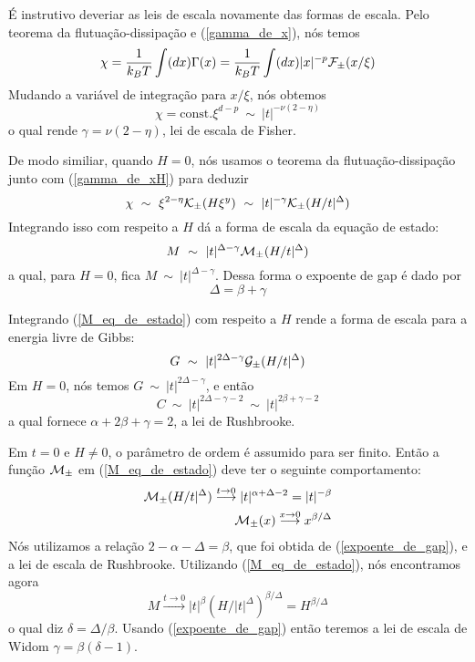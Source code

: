 É instrutivo deveriar as leis de escala novamente das formas de escala. Pelo teorema da flutuação-dissipação e (\ref{gamma_de_x}), nós temos
\begin{eqnarray*}
\chi=\frac{1}{k_{B}T}\int (dx) \Gamma(x)=\frac{1}{k_{B}T}\int (dx) |x|^{-p} {\cal F}_{\pm}(x/\xi)
\end{eqnarray*}
Mudando a variável de integração para $x/\xi$, nós obtemos
\begin{equation}
\chi= \text{const.}\xi^{d-p}~\sim~|t|^{-\nu(2-\eta)}
\end{equation}
o qual rende $\gamma=\nu(2-\eta)$, lei de escala de Fisher.

De modo similiar, quando $H=0$, nós usamos o teorema da flutuação-dissipação junto com (\ref{gamma_de_xH}) para deduzir
\begin{equation}
\chi~\sim~\xi^{2-\eta}{\cal K}_{\pm}(H\xi^{y})~\sim~|t|^{-\gamma}{\cal K}_{\pm}(H/t|^{\Delta})
\end{equation}
Integrando isso com respeito a $H$ dá a forma de escala da equação de estado:
\begin{equation}
M~\sim~|t|^{\Delta-\gamma}{\cal M}_{\pm}(H/t|^{\Delta})
\label{M_eq_de_estado}
\end{equation}
a qual, para $H=0$, fica $M~\sim~|t|^{\Delta-\gamma}$. Dessa forma o expoente de gap é dado por
\begin{equation}
\Delta=\beta+\gamma
\label{expoente_de_gap}
\end{equation}

Integrando (\ref{M_eq_de_estado}) com respeito a $H$ rende a forma de escala para a energia livre de Gibbs:
\begin{equation}
G~\sim~|t|^{2\Delta-\gamma}{\cal G}_{\pm}(H/t|^{\Delta})
\label{energia_G_de_xi}
\end{equation}
Em $H=0$, nós temos $G~\sim~|t|^{2\Delta-\gamma}$, e então
\begin{equation}
C~\sim~|t|^{2\Delta-\gamma-2}~\sim~|t|^{2\beta+\gamma-2}
\end{equation}
a qual fornece $\alpha+2\beta+\gamma=2$, a lei de Rushbrooke.

Em $t=0$ e $H \neq 0$, o parâmetro de ordem é assumido para ser finito. Então a função ${\cal M}_{\pm}$ em (\ref{M_eq_de_estado}) deve ter o seguinte comportamento:
\begin{eqnarray}
{\cal M}_{\pm}(H/t|^{\Delta})\stackrel{t\rightarrow0}{\longrightarrow}|t|^{\alpha+\Delta-2}=|t|^{-\beta}
\nonumber \\
{\cal M}_{\pm}(x)\stackrel{x\rightarrow0}{\longrightarrow}x^{\beta/\Delta}
\end{eqnarray}
Nós utilizamos a relação $2-\alpha-\Delta=\beta$, que foi obtida de (\ref{expoente_de_gap}), e a lei de escala de Rushbrooke. Utilizando (\ref{M_eq_de_estado}), nós encontramos agora
\begin{equation}
M\stackrel{t\rightarrow0}{\longrightarrow}|t|^{\beta}(H/|t|^{\Delta})^{\beta/\Delta}=H^{\beta/\Delta}
\end{equation}
o qual diz $\delta=\Delta/\beta$. Usando (\ref{expoente_de_gap}) então teremos a lei de escala de Widom $\gamma=\beta(\delta-1)$.

